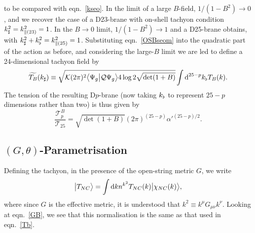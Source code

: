 \documentclass[letterpaper,12pt]{article}
\def\Pcm#1{{\mathcal{#1}}}
\def\er#1{eqn.~\eqref{#1}}
\newcommand{\td}{\textup{d}}
\begin{document}
to be compared with \er{kseo}. In the limit of a large $B$-field, $1/(1-B^2)\rightarrow 0$, and we
recover the case of a D23-brane with on-shell tachyon condition $k_\sharp^2=k_{\parallel(23)}^2=1$. In the
$B\rightarrow 0$ limit, $1/(1-B^2)\rightarrow 1$ and a D25-brane obtains, 
with $k_\sharp^2+k_\flat^2=k_{\parallel(25)}^2=1$.
Substituting \er{OSBseom} into the quadratic part of the action as before, 
and considering the large-$B$ limit we are led to
define a 24-dimensional tachyon field by
\begin{equation}
\label{newtachB}
  \widetilde{T_B}(\kn) \equiv 
  \sqrt{\Pcm{K} (2\pi)^2 \big\langle\Psi_g\big|\Pcm{Q}\Psi_g\big\rangle 4\log2 \sqrt{\det (1+B)}  } 
  \int \td^{25-p}\kb T_B(k)
.\end{equation}
The tension of the resulting D$p$-brane (now taking $k_\flat$ to represent $25-p$ dimensions rather than two) 
is thus given by
\begin{equation}
\label{Btension}
\frac{\Pcm{T}^B_p}{\Pcm{T}_{25}}
 = { \sqrt{\det(1+B)} }{(2\pi)^{(25-p)}{\alpha'}^{(25-p)/2} } 
.\end{equation}


\subsection{$(G,\theta)$-Parametrisation}

Defining the tachyon, in the presence of the open-string metric $G$, we write
\begin{equation}
 \big|T_{NC}\big\rangle = \int \td k n^{k^2 } T_{NC}(k) \big|\chi_{NC}(k)\big\rangle 
,\end{equation}
where since $G$ is the effective metric, it is understood that $k^2 \equiv k^\mu G_{\mu\nu} k^\nu$.
Looking at \er{GB}, we see that this normalisation is the same as that used in \er{Tb}.
\end{document}
